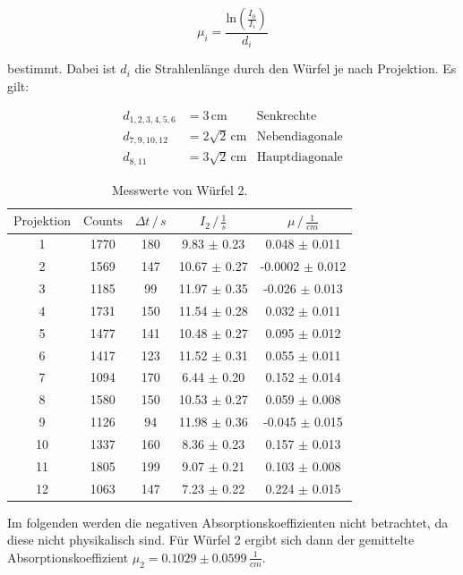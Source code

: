 \begin{equation}
\mu_i = \frac{\text{ln}(\frac{I_0}{I_i})}{d_i}
\label{eqn:mu}
\end{equation}

\noindent
bestimmt. Dabei ist $d_i$ die Strahlenlänge durch den Würfel je nach Projektion.
Es gilt:

\begin{align*}
d_{1,2,3,4,5,6} &= 3 \, \text{cm}       &\text{Senkrechte}\\
d_{7,9,10,12} &= 2 \sqrt{2} \, \text{cm} &\text{Nebendiagonale}\\
d_{8,11} &= 3 \sqrt{2} \, \text{cm} &\text{Hauptdiagonale}
\end{align*}

\begin{table}
  \centering
  \label{tab:w2}
  \begin{tabular}{c c c c c}
  \toprule
  $\text{Projektion}$ & $\text{Counts}$ & $\Delta t \,/\, s $ & $I_2 \,/\, \frac{1}{s} $ & $\mu \,/\, \frac{1}{cm}$\\
  \midrule 
 1 & 1770 & 180 & 9.83 $\pm$ 0.23  & 0.048   $\pm$ 0.011 \\
 2 & 1569 & 147 & 10.67 $\pm$ 0.27 & -0.0002 $\pm$ 0.012 \\
 3 & 1185 & 99 & 11.97 $\pm$ 0.35  & -0.026  $\pm$ 0.013 \\
 4 & 1731 & 150 & 11.54 $\pm$ 0.28  & 0.032   $\pm$ 0.011 \\
 5 & 1477 & 141 & 10.48 $\pm$ 0.27 & 0.095   $\pm$ 0.012 \\
 6 & 1417 & 123 & 11.52 $\pm$ 0.31  & 0.055   $\pm$ 0.011 \\
 7 & 1094 & 170 & 6.44 $\pm$ 0.20  & 0.152   $\pm$ 0.014 \\
 8 & 1580 & 150 & 10.53 $\pm$ 0.27 & 0.059   $\pm$  0.008\\
 9 & 1126 & 94 & 11.98 $\pm$ 0.36  & -0.045  $\pm$  0.015 \\
10 & 1337 & 160 & 8.36 $\pm$ 0.23  & 0.157   $\pm$ 0.013 \\
11 & 1805 & 199 & 9.07 $\pm$ 0.21   &  0.103  $\pm$ 0.008  \\
12 & 1063 & 147 & 7.23 $\pm$ 0.22  & 0.224   $\pm$ 0.015 \\
\bottomrule
\end{tabular}
\label{tab:w2}
\caption{Messwerte von Würfel 2.}
\end{table}

\noindent
Im folgenden werden die negativen Absorptionskoeffizienten nicht betrachtet, da diese nicht physikalisch sind.
Für Würfel 2 ergibt sich dann der gemittelte Absorptionskoeffizient $\mu_2 = 0.1029 \pm 0.0599 \, \frac{1}{cm}$.

